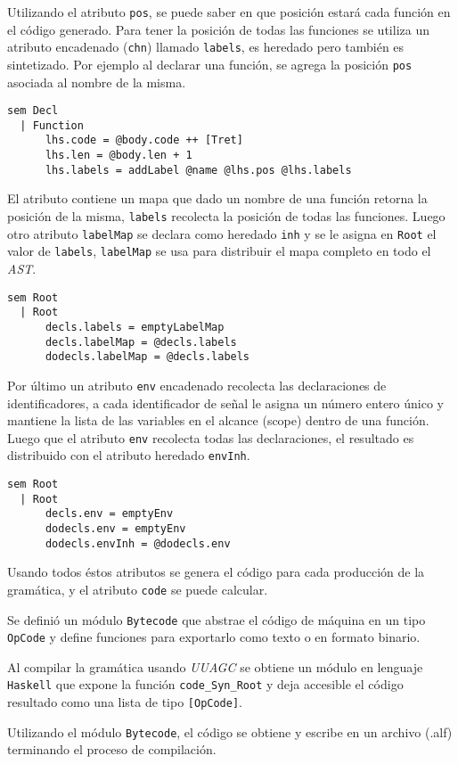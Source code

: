   Utilizando el atributo \texttt{pos}, se puede saber en que posición
  estará cada función en el código generado.
  Para tener la posición de todas las funciones se utiliza un atributo
  encadenado (\texttt{chn}) llamado \texttt{labels},
  es heredado pero también es sintetizado.
  Por ejemplo al declarar una función, se agrega la posición \texttt{pos}
  asociada al nombre de la misma.

\begin{Verbatim}
sem Decl
  | Function
      lhs.code = @body.code ++ [Tret]
      lhs.len = @body.len + 1
      lhs.labels = addLabel @name @lhs.pos @lhs.labels
\end{Verbatim}

  El atributo contiene un mapa que dado un nombre de una función retorna
  la posición de la misma, \texttt{labels} recolecta la posición de todas
  las funciones.
  Luego otro atributo \texttt{labelMap} se declara como heredado \texttt{inh}
  y se le asigna en \texttt{Root} el valor de \texttt{labels},
  \texttt{labelMap} se usa para distribuir el mapa
  completo en todo el \textit{AST}.

\begin{Verbatim}
sem Root
  | Root
      decls.labels = emptyLabelMap
      decls.labelMap = @decls.labels
      dodecls.labelMap = @decls.labels
\end{Verbatim}

  Por último un atributo \texttt{env} encadenado recolecta las declaraciones
  de identificadores, a cada identificador de señal le asigna un número
  entero único y mantiene la lista de las variables en el alcance (scope)
  dentro de una función. 
  Luego que el atributo \texttt{env} recolecta todas las declaraciones,
  el resultado es distribuido con el atributo heredado \texttt{envInh}.

\begin{Verbatim}
sem Root
  | Root
      decls.env = emptyEnv
      dodecls.env = emptyEnv
      dodecls.envInh = @dodecls.env
\end{Verbatim}

  Usando todos éstos atributos se genera el código para cada producción
  de la gramática, y el atributo \texttt{code} se puede calcular.

  Se definió un módulo \texttt{Bytecode} que abstrae el código
  de máquina en un tipo \texttt{OpCode} y define funciones para 
  exportarlo como texto o en formato binario.


  Al compilar la gramática usando \textit{UUAGC} se obtiene un módulo
  en lenguaje \texttt{Haskell} que expone la función \texttt{code\_Syn\_Root}
  y deja accesible el código resultado como una lista de
  tipo \texttt{[OpCode]}.

  Utilizando el módulo \texttt{Bytecode}, el código se obtiene y 
  escribe en un archivo (.alf) terminando el proceso de compilación.

